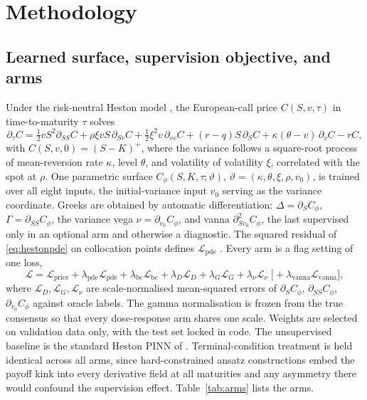 \documentclass[10pt]{article}
\begin{document}
\section{Methodology}
\label{sec:method}

\subsection{Learned surface, supervision objective, and arms}
\label{sec:loss}
Under the risk-neutral Heston model \citep{heston1993closed}, the European-call
price $C(S,v,\tau)$ in time-to-maturity $\tau$ solves
\begin{equation}\label{eq:hestonpde}
\partial_\tau C=\tfrac12 vS^{2}\partial_{SS}C+\rho\xi vS\,\partial_{Sv}C
+\tfrac12\xi^{2}v\,\partial_{vv}C+(r-q)S\,\partial_{S}C
+\kappa(\theta-v)\,\partial_{v}C-rC,
\end{equation}
with $C(S,v,0)=(S-K)^{+}$, where the variance follows a square-root process of
mean-reversion rate $\kappa$, level $\theta$, and volatility of volatility $\xi$,
correlated with the spot at $\rho$. One parametric surface
$C_\phi(S,K,\tau;\vartheta)$, $\vartheta=(\kappa,\theta,\xi,\rho,v_0)$, is trained
over all eight inputs, the initial-variance input $v_0$ serving as the variance
coordinate. Greeks are obtained by automatic differentiation:
$\Delta=\partial_S C_\phi$, $\Gamma=\partial_{SS}C_\phi$, the variance vega
$\nu=\partial_{v_0}C_\phi$, and vanna $\partial^2_{S v_0}C_\phi$, the last
supervised only in an optional arm and otherwise a diagnostic. The squared residual
of \eqref{eq:hestonpde} on collocation points defines
$\mathcal{L}_{\mathrm{pde}}$ \citep{raissi2019physics}. Every arm is a flag setting
of one loss,
\begin{equation}\label{eq:loss}
\mathcal{L}=\mathcal{L}_{\mathrm{price}}
+\lambda_{\mathrm{pde}}\mathcal{L}_{\mathrm{pde}}
+\lambda_{\mathrm{bc}}\mathcal{L}_{\mathrm{bc}}
+\lambda_{D}\mathcal{L}_{D}+\lambda_{G}\mathcal{L}_{G}
+\lambda_{\nu}\mathcal{L}_{\nu}
\;\bigl[+\lambda_{\mathrm{vanna}}\mathcal{L}_{\mathrm{vanna}}\bigr],
\end{equation}
where $\mathcal{L}_{D},\mathcal{L}_{G},\mathcal{L}_{\nu}$ are scale-normalised
mean-squared errors of $\partial_S C_\phi$, $\partial_{SS}C_\phi$,
$\partial_{v_0}C_\phi$ against oracle labels. The gamma normalisation is frozen from
the true consensus so that every dose-response arm shares one scale. Weights are
selected on validation data only, with the test set locked in code. The unsupervised
baseline is the standard Heston PINN of \citet{hainaut2024option}. Terminal-condition
treatment is held identical across all arms, since hard-constrained ansatz
constructions \citep{lagaris1998artificial} embed the payoff kink into every
derivative field at all maturities and any asymmetry there would confound the
supervision effect. Table~\ref{tab:arms} lists the arms.
\end{document}
